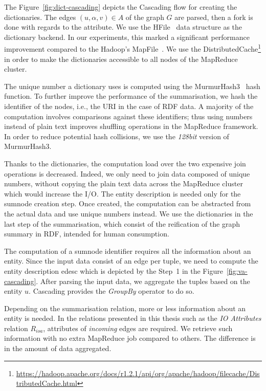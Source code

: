 The Figure~\ref{fig:dict-cascading} depicts the Cascading flow for creating the dictionaries. The edges $(u, \alpha, v) \in A$ of the graph $G$ are parsed, then a fork is done with regards to the attribute. We use the HFile~\cite{hfile} data structure as the dictionary backend. In our experiments, this marked a significant performance improvement compared to the Hadoop's MapFile~\cite{mapfile}. We use the DistributedCache\footnote{\url{https://hadoop.apache.org/docs/r1.2.1/api/org/apache/hadoop/filecache/DistributedCache.html}} in order to make the dictionaries accessible to all nodes of the MapReduce cluster.

The unique number a dictionary uses is computed using the MurmurHash3~\cite{murmurhash3-gcode,murmurhash3-blog} hash function. To further improve the performance of the summarisation, we hash the identifier of the nodes, i.e., the URI in the case of RDF data. A majority of the computation involves comparisons against these identifiers; thus using numbers instead of plain text improves shuffling operations in the MapReduce framework. In order to reduce potential hash collisions, we use the \emph{128bit} version of MurmurHash3.

Thanks to the dictionaries, the computation load over the two expensive join operations is decreased. Indeed, we only need to join data composed of unique numbers, without copying the plain text data across the MapReduce cluster which would increase the I/O. The entity description is needed only for the sumnode creation step. Once created, the computation can be abstracted from the actual data and use unique numbers instead. We use the dictionaries in the last step of the summarisation, which consist of the reification of the graph summary in RDF, intended for human consumption.


The computation of a sumnode identifier requires all the information about an entity. Since the input data consist of an edge per tuple, we need to compute the entity description \gls{edesc} which is depicted by the Step~1 in the Figure~\ref{fig:va-cascading}. After parsing the input data, we aggregate the tuples based on the entity $u$. Cascading provides the \emph{GroupBy} operator to do so.

Depending on the summarisation relation, more or less information about an entity is needed. In the relations presented in this thesis such as the \emph{IO Attributes} relation $R_{ioa}$, attributes of \emph{incoming} edges are required. We retrieve such information with no extra MapReduce job compared to others. The difference is in the amount of data aggregated.

